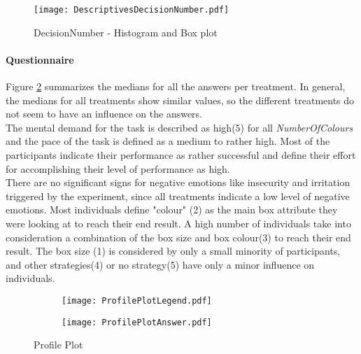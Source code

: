 \begin{figure}[htbp] %
\begin{center} 
\texttt{[image: DescriptivesDecisionNumber.pdf]}
  \caption{DecisionNumber - Histogram and Box plot}
    \label{DistributionDecisionNumber} 
\end{center}
\end{figure}

\paragraph{Questionnaire}
\label{ch:Evaluation:sec:DescriptiveStatistics:subsec:Questionnaire}

Figure \ref{ProfilePlot} summarizes the medians for all the answers per treatment. In general, the medians for all treatments show similar values, so the different treatments do not seem to have an influence on the answers.\\
The mental demand for the task is described as high(5) for all \textit{NumberOfColours} and the pace of the task is defined as a medium to rather high. 
Most of the participants indicate their performance as rather successful and define their effort for accomplishing their level of performance as high.\\  
There are no significant signs for negative emotions like insecurity and irritation triggered by the experiment, since all treatments indicate a low level of negative emotions. 
Most individuals define "colour" (2) as the main box attribute they were looking at to reach their end result. A high number of individuals take into consideration a combination of the box size and box colour(3) to reach their end result.
The box size (1) is considered by only a small minority of participants, and other strategies(4) or no strategy(5) have only a minor influence on individuals. 

 \begin{figure}[htbp] %
\begin{center} %
\begin{subfigure} 
\centering
 \texttt{[image: ProfilePlotLegend.pdf]}
\end{subfigure} 
\begin{subfigure}
\centering
 \texttt{[image: ProfilePlotAnswer.pdf]}
\end{subfigure}   
  \caption{Profile Plot}
  \label{ProfilePlot}
\end{center}
\end{figure}

